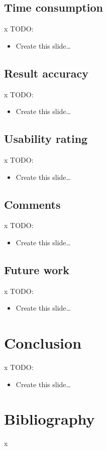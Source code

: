 \documentclass{beamer}
\newlength{\wideitemsep}
\let\olditem\item
\renewcommand{\item}[1][\wideitemsep]{\setlength{\itemsep}{#1}\olditem}
\begin{document}
\subsection{Time consumption}
\begin{frame}{x}{}
TODO:
\begin{itemize}
\item Create this slide\ldots
\end{itemize}
\end{frame}


\subsection{Result accuracy}
\begin{frame}{x}{}
TODO:
\begin{itemize}
\item Create this slide\ldots
\end{itemize}
\end{frame}


\subsection{Usability rating}
\begin{frame}{x}{}
TODO:
\begin{itemize}
\item Create this slide\ldots
\end{itemize}
\end{frame}


\subsection{Comments}
\begin{frame}{x}{}
TODO:
\begin{itemize}
\item Create this slide\ldots
\end{itemize}
\end{frame}


\subsection{Future work}
\begin{frame}{x}{}
TODO:
\begin{itemize}
\item Create this slide\ldots
\end{itemize}
\end{frame}



\section{Conclusion}
\begin{frame}{x}{}
TODO:
\begin{itemize}
\item Create this slide\ldots
\end{itemize}
\end{frame}



\section*{Bibliography}
\begin{frame}[allowframebreaks]{x}{}
\nocite{all, the, things}

\tiny{}
\end{frame}
\end{document}
